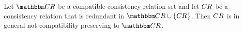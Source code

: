 \begin{proposition} \label{prop:redundantnotimpliescompatible}
    Let $\consistencyrelationset{CR}$ be a compatible consistency relation set and let $\consistencyrelation{CR}{}$ be a consistency relation that is redundant in $\consistencyrelationset{CR} \cup \setted{\consistencyrelation{CR}{}}$.
    Then $\consistencyrelation{CR}{}$ is in general not compatibility-preserving to $\consistencyrelationset{CR}$.
\end{proposition}
%
